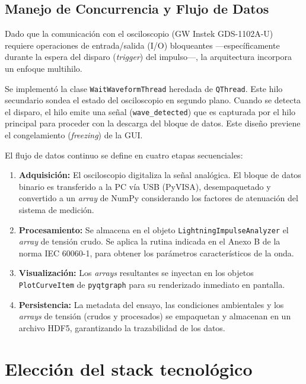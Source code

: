 \subsection{Manejo de Concurrencia y Flujo de Datos}

Dado que la comunicación con el osciloscopio (GW Instek GDS-1102A-U) requiere operaciones de entrada/salida (I/O) bloqueantes —específicamente durante la espera del disparo (\textit{trigger}) del impulso—, la arquitectura incorpora un enfoque multihilo.

Se implementó la clase \texttt{WaitWaveformThread} heredada de \texttt{QThread}. Este hilo secundario sondea el estado del osciloscopio en segundo plano. Cuando se detecta el disparo, el hilo emite una señal (\texttt{wave\_detected}) que es capturada por el hilo principal para proceder con la descarga del bloque de datos. Este diseño previene el congelamiento (\textit{freezing}) de la GUI.

El flujo de datos continuo se define en cuatro etapas secuenciales:

\begin{enumerate}
    \item \textbf{Adquisición:} El osciloscopio digitaliza la señal analógica. El bloque de datos binario es transferido a la PC vía USB (PyVISA), desempaquetado y convertido a un \textit{array} de NumPy considerando los factores de atenuación del sistema de medición.
    \item \textbf{Procesamiento:} Se almacena en el objeto \texttt{LightningImpulseAnalyzer} el \textit{array} de tensión crudo. Se aplica la rutina indicada en el Anexo B de la norma IEC 60060-1, para obtener los parámetros característicos de la onda.
    \item \textbf{Visualización:} Los \textit{arrays} resultantes se inyectan en los objetos \texttt{PlotCurveItem} de \texttt{pyqtgraph} para su renderizado inmediato en pantalla.
    \item \textbf{Persistencia:} La metadata del ensayo, las condiciones ambientales y los \textit{arrays} de tensión (crudos y procesados) se empaquetan y almacenan en un archivo HDF5, garantizando la trazabilidad de los datos.
\end{enumerate}

\section{Elección del stack tecnológico}

